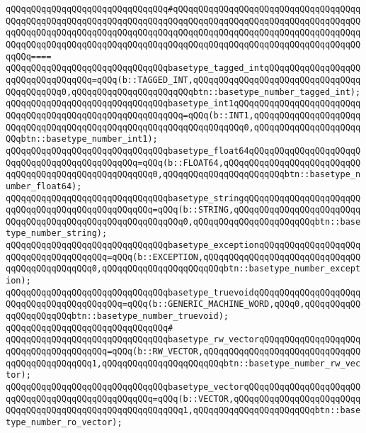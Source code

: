 \verb|qQQqqQQqqQQqqQQqqQQqqQQqqQQqqQQq#qQQqqQQqqQQqqQQqqQQqqQQqqQQqqQQqqQQqqQQqqQQqqQQqqQQqqQQqqQQqqQQqqQQqqQQqqQQqqQQqqQQqqQQqqQQqqQQqqQQqqQQqqQQqqQQqqQQqqQQqqQQqqQQqqQQqqQQqqQQqqQQqqQQqqQQqqQQqqQQqqQQqqQQqqQQqqQQqqQQqqQQqqQQqqQQqqQQqqQQqqQQqqQQqqQQqqQQqqQQqqQQqqQQqqQQqqQQqqQQqqQQqqQQqqQQq====|\newline
\verb|qQQqqQQqqQQqqQQqqQQqqQQqqQQqqQQqbasetype_tagged_intqQQqqQQqqQQqqQQqqQQqqQQqqQQqqQQqqQQq=qQQq(b::TAGGED_INT,qQQqqQQqqQQqqQQqqQQqqQQqqQQqqQQqqQQqqQQqqQQq0,qQQqqQQqqQQqqQQqqQQqqQQqbtn::basetype_number_tagged_int);|\newline
\verb|qQQqqQQqqQQqqQQqqQQqqQQqqQQqqQQqbasetype_int1qQQqqQQqqQQqqQQqqQQqqQQqqQQqqQQqqQQqqQQqqQQqqQQqqQQqqQQqqQQq=qQQq(b::INT1,qQQqqQQqqQQqqQQqqQQqqQQqqQQqqQQqqQQqqQQqqQQqqQQqqQQqqQQqqQQqqQQqqQQq0,qQQqqQQqqQQqqQQqqQQqqQQqbtn::basetype_number_int1);|\newline
\verb|qQQqqQQqqQQqqQQqqQQqqQQqqQQqqQQqbasetype_float64qQQqqQQqqQQqqQQqqQQqqQQqqQQqqQQqqQQqqQQqqQQqqQQq=qQQq(b::FLOAT64,qQQqqQQqqQQqqQQqqQQqqQQqqQQqqQQqqQQqqQQqqQQqqQQqqQQqqQQq0,qQQqqQQqqQQqqQQqqQQqqQQqbtn::basetype_number_float64);|\newline
\verb|qQQqqQQqqQQqqQQqqQQqqQQqqQQqqQQqbasetype_stringqQQqqQQqqQQqqQQqqQQqqQQqqQQqqQQqqQQqqQQqqQQqqQQqqQQq=qQQq(b::STRING,qQQqqQQqqQQqqQQqqQQqqQQqqQQqqQQqqQQqqQQqqQQqqQQqqQQqqQQqqQQq0,qQQqqQQqqQQqqQQqqQQqqQQqbtn::basetype_number_string);|\newline
\verb|qQQqqQQqqQQqqQQqqQQqqQQqqQQqqQQqbasetype_exceptionqQQqqQQqqQQqqQQqqQQqqQQqqQQqqQQqqQQqqQQq=qQQq(b::EXCEPTION,qQQqqQQqqQQqqQQqqQQqqQQqqQQqqQQqqQQqqQQqqQQqqQQq0,qQQqqQQqqQQqqQQqqQQqqQQqbtn::basetype_number_exception);|\newline
\verb|qQQqqQQqqQQqqQQqqQQqqQQqqQQqqQQqbasetype_truevoidqQQqqQQqqQQqqQQqqQQqqQQqqQQqqQQqqQQqqQQqqQQq=qQQq(b::GENERIC_MACHINE_WORD,qQQq0,qQQqqQQqqQQqqQQqqQQqqQQqbtn::basetype_number_truevoid);|\newline
\verb|qQQqqQQqqQQqqQQqqQQqqQQqqQQqqQQq#|\newline
\verb|qQQqqQQqqQQqqQQqqQQqqQQqqQQqqQQqbasetype_rw_vectorqQQqqQQqqQQqqQQqqQQqqQQqqQQqqQQqqQQqqQQq=qQQq(b::RW_VECTOR,qQQqqQQqqQQqqQQqqQQqqQQqqQQqqQQqqQQqqQQqqQQqqQQq1,qQQqqQQqqQQqqQQqqQQqqQQqbtn::basetype_number_rw_vector);|\newline
\verb|qQQqqQQqqQQqqQQqqQQqqQQqqQQqqQQqbasetype_vectorqQQqqQQqqQQqqQQqqQQqqQQqqQQqqQQqqQQqqQQqqQQqqQQqqQQq=qQQq(b::VECTOR,qQQqqQQqqQQqqQQqqQQqqQQqqQQqqQQqqQQqqQQqqQQqqQQqqQQqqQQqqQQq1,qQQqqQQqqQQqqQQqqQQqqQQqbtn::basetype_number_ro_vector);|\newline
